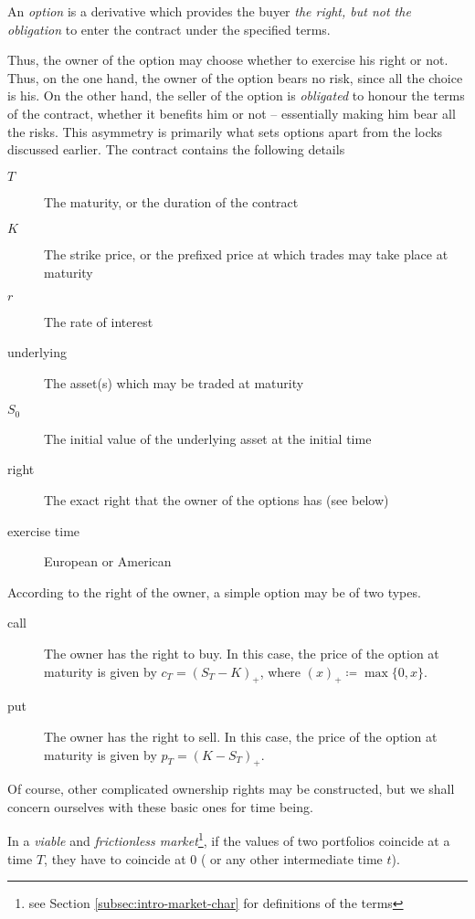 \begin{dfn}[option]
	An \emph{option} is a derivative which provides the buyer \emph{the right, but not the obligation} to enter the contract under the specified terms.
\end{dfn}

Thus, the owner of the option may choose whether to exercise his right or not. Thus, on the one hand, the owner of the option bears no risk, since all the choice is his. On the other hand, the seller of the option is \emph{obligated} to honour the terms of the contract, whether it benefits him or not -- essentially making him bear all the risks. This asymmetry is primarily what sets options apart from the locks discussed earlier.
The contract contains the following details
\begin{description}
	\item[$ T $] The maturity, or the duration of the contract
	\item[$ K $] The strike price, or the prefixed price at which trades may take place at maturity
	\item[$ r $] The rate of interest
	\item[underlying] The asset(s) which may be traded at maturity
	\item[$ S_0 $] The initial value of the underlying asset at the initial time
	\item[right] The exact right that the owner of the options has (see below)
	\item[exercise time] European or American
\end{description}

According to the right of the owner, a simple option may be of two types.
\begin{description}
	\item[call] The owner has the right to buy. In this case, the price of the option at maturity is given by $ c_T = (S_T - K)_+ $, where $ (x)_+ \coloneqq \max \{ 0, x \} $.
	\item[put] The owner has the right to sell. In this case, the price of the option at maturity is given by $ p_T = (K - S_T)_+ $.
\end{description}
Of course, other complicated ownership rights may be constructed, but we shall concern ourselves with these basic ones for time being.


\begin{prp}
	\label{thm:intro-portfolio-eq}
	In a \emph{viable} and \emph{frictionless market}\footnote{see Section \ref{subsec:intro-market-char} for definitions of the terms}, if the values of two portfolios coincide at a time $ T $, they have to coincide at $ 0 $ ( or any other intermediate time $ t $).
\end{prp}

